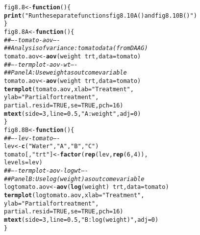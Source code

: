 \documentclass[12pt, a4paper,  BCOR=8.25mm, DIV=15]{scrartcl}\usepackage[]{graphicx}\usepackage[]{color}
\makeatletter
\newcommand{\hlnum}[1]{\textcolor[rgb]{0.686,0.059,0.569}{#1}}%
\newcommand{\hlstr}[1]{\textcolor[rgb]{0.192,0.494,0.8}{#1}}%
\newcommand{\hlcom}[1]{\textcolor[rgb]{0.678,0.584,0.686}{\textit{#1}}}%
\newcommand{\hlopt}[1]{\textcolor[rgb]{0,0,0}{#1}}%
\newcommand{\hlstd}[1]{\textcolor[rgb]{0.345,0.345,0.345}{#1}}%
\newcommand{\hlkwa}[1]{\textcolor[rgb]{0.161,0.373,0.58}{\textbf{#1}}}%
\newcommand{\hlkwb}[1]{\textcolor[rgb]{0.69,0.353,0.396}{#1}}%
\newcommand{\hlkwc}[1]{\textcolor[rgb]{0.333,0.667,0.333}{#1}}%
\newcommand{\hlkwd}[1]{\textcolor[rgb]{0.737,0.353,0.396}{\textbf{#1}}}%
\newenvironment{kframe}{%
 \def\at@end@of@kframe{}%
 \ifinner\ifhmode%
  \def\at@end@of@kframe{\end{minipage}}%
  \begin{minipage}{\columnwidth}%
 \fi\fi%
 \def\FrameCommand##1{\hskip\@totalleftmargin \hskip-\fboxsep
 \colorbox{shadecolor}{##1}\hskip-\fboxsep
     \hskip-\linewidth \hskip-\@totalleftmargin \hskip\columnwidth}%
 \MakeFramed {\advance\hsize-\width
   \@totalleftmargin\z@ \linewidth\hsize
   \@setminipage}}%
 {\par\unskip\endMakeFramed%
 \at@end@of@kframe}
\newenvironment{knitrout}{}{} %
\makeatother
\begin{document}
\begin{knitrout}
\color{fgcolor}\begin{kframe}
\begin{alltt}
\hlstd{fig8.8} \hlkwb{<-} \hlkwa{function}\hlstd{()\{}
\hlkwd{print}\hlstd{(}\hlstr{"Run the separate functions fig8.10A() and fig8.10B()"}\hlstd{)}
\hlstd{\}}
\hlstd{fig8.8A} \hlkwb{<-} \hlkwa{function}\hlstd{()\{}
\hlcom{## ---- tomato-aov ----}
\hlcom{## Analysis of variance: tomato data (from DAAG)}
\hlstd{tomato.aov} \hlkwb{<-} \hlkwd{aov}\hlstd{(weight} \hlopt{~} \hlstd{trt,} \hlkwc{data}\hlstd{=tomato)}
\hlcom{## ---- termplot-aov-wt ----}
\hlcom{## Panel A: Use weight as outcome variable}
\hlstd{tomato.aov} \hlkwb{<-} \hlkwd{aov}\hlstd{(weight} \hlopt{~} \hlstd{trt,} \hlkwc{data}\hlstd{=tomato)}
\hlkwd{termplot}\hlstd{(tomato.aov,} \hlkwc{xlab}\hlstd{=}\hlstr{"Treatment"}\hlstd{,}
         \hlkwc{ylab}\hlstd{=}\hlstr{"Partial for treatment"}\hlstd{,}
         \hlkwc{partial.resid}\hlstd{=}\hlnum{TRUE}\hlstd{,} \hlkwc{se}\hlstd{=}\hlnum{TRUE}\hlstd{,} \hlkwc{pch}\hlstd{=}\hlnum{16}\hlstd{)}
\hlkwd{mtext}\hlstd{(}\hlkwc{side}\hlstd{=}\hlnum{3}\hlstd{,} \hlkwc{line}\hlstd{=}\hlnum{0.5}\hlstd{,} \hlstr{"A: weight"}\hlstd{,} \hlkwc{adj}\hlstd{=}\hlnum{0}\hlstd{)}
\hlstd{\}}
\hlstd{fig8.8B} \hlkwb{<-} \hlkwa{function}\hlstd{()\{}
\hlcom{## ---- lev-tomato ----}
\hlstd{lev} \hlkwb{<-} \hlkwd{c}\hlstd{(}\hlstr{"Water"}\hlstd{,} \hlstr{"A"}\hlstd{,} \hlstr{"B"}\hlstd{,} \hlstr{"C"}\hlstd{)}
\hlstd{tomato[,} \hlstr{"trt"}\hlstd{]} \hlkwb{<-} \hlkwd{factor}\hlstd{(}\hlkwd{rep}\hlstd{(lev,} \hlkwd{rep}\hlstd{(}\hlnum{6}\hlstd{,}\hlnum{4}\hlstd{)),}
                          \hlkwc{levels}\hlstd{=lev)}
\hlcom{## ---- termplot-aov-logwt ----}
\hlcom{## Panel B: Use log(weight) as outcome variable}
\hlstd{logtomato.aov} \hlkwb{<-} \hlkwd{aov}\hlstd{(}\hlkwd{log}\hlstd{(weight)} \hlopt{~} \hlstd{trt,} \hlkwc{data}\hlstd{=tomato)}
\hlkwd{termplot}\hlstd{(logtomato.aov,} \hlkwc{xlab}\hlstd{=}\hlstr{"Treatment"}\hlstd{,}
         \hlkwc{ylab}\hlstd{=}\hlstr{"Partial for treatment"}\hlstd{,}
         \hlkwc{partial.resid}\hlstd{=}\hlnum{TRUE}\hlstd{,} \hlkwc{se}\hlstd{=}\hlnum{TRUE}\hlstd{,} \hlkwc{pch}\hlstd{=}\hlnum{16}\hlstd{)}
\hlkwd{mtext}\hlstd{(}\hlkwc{side}\hlstd{=}\hlnum{3}\hlstd{,} \hlkwc{line}\hlstd{=}\hlnum{0.5}\hlstd{,} \hlstr{"B: log(weight)"}\hlstd{,} \hlkwc{adj}\hlstd{=}\hlnum{0}\hlstd{)}
\hlstd{\}}
\end{alltt}
\end{kframe}
\end{knitrout}
\end{document}
